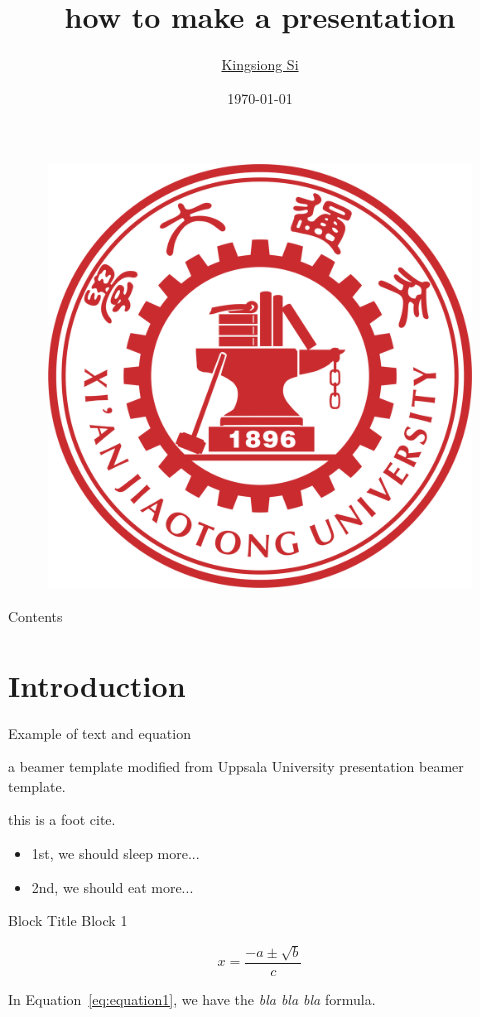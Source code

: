 \documentclass{beamer}
\author[K. Si, \contact]{\href{}{Kingsiong Si}}
\institute[IMKFE, XJTU]{\href{}{Institute of Multimedia Knowledge Fusion and Engineering,\\ Xi'an Jiaotong University}
    \\ \smallskip \contact}
\title[beamer]{how to make a presentation}
\date{\today}
\begin{document}
{

\begin{frame}\label{start}
    \titlepage
    \begin{figure}
            \includegraphics[width=.2\textwidth]{style/xjtu_logo.png} 
    \end{figure}
\end{frame}
}

\begin{frame}{Contents}
    \tableofcontents[sectionstyle=show, subsectionstyle=show/shaded/hide, subsubsectionstyle=show/shaded/hide]
\end{frame}


\section{Introduction}

\begin{frame}{Example of text and equation}

    a beamer template modified from Uppsala University presentation beamer template. 

    this is a foot cite.

    \begin{itemize}[<+->]
        \item 1st, we should sleep more...
        \item 2nd, we should eat more...
    \end{itemize}

    \begin{block}{Block Title}
        Block 1
    \end{block}

    \centering
    \begin{equation}
        x = \frac{{-a \pm \sqrt{{b}}}}{{c}}
        \label{eq:equation1}
    \end{equation}

    In Equation~\ref{eq:equation1}, we have the \textit{bla bla bla} formula.

\end{frame}
\end{document}

